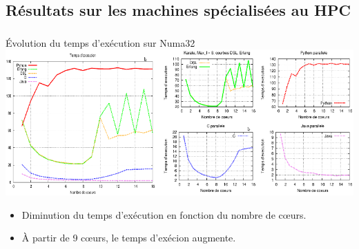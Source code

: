 \documentclass[10pt]{beamer}
\begin{document}
\subsection{Résultats sur les machines spécialisées au HPC}
\begin{frame}%
\frametitle{}
\begin{block}{Évolution du temps d'exécution sur Numa32}
 \includegraphics[scale=0.425]{images/kar_idr_time}
\end{block}
 \begin{itemize}
  \item Diminution du temps d'exécution en fonction du nombre de c\oe urs.
  \item À  partir de 9 c\oe urs, le temps d'exécion augmente.
 \end{itemize}

\end{frame}
\end{document}
